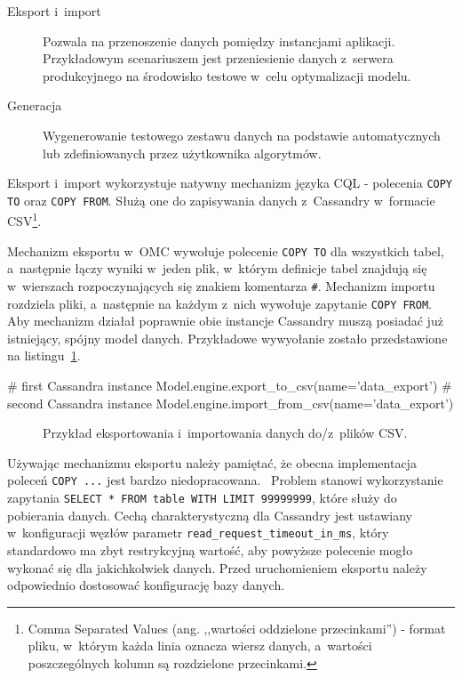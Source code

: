 \begin{description}
	\item[Eksport i~import] Pozwala na przenoszenie danych pomiędzy instancjami aplikacji. Przykładowym scenariuszem jest przeniesienie danych z~serwera produkcyjnego na środowisko testowe w~celu optymalizacji modelu.
	\item[Generacja] Wygenerowanie testowego zestawu danych na podstawie automatycznych lub zdefiniowanych przez użytkownika algorytmów.
\end{description}

Eksport i~import wykorzystuje natywny mechanizm języka CQL - polecenia \verb+COPY TO+ oraz \verb+COPY FROM+. Służą one do zapisywania danych z~Cassandry w~formacie CSV\footnote{Comma Separated Values (ang. ,,wartości oddzielone przecinkami'') - format pliku, w~którym każda linia oznacza wiersz danych, a~wartości poszczególnych kolumn są rozdzielone przecinkami.}. 

Mechanizm eksportu w~OMC wywołuje polecenie \verb+COPY TO+ dla wszystkich tabel, a~następnie łączy wyniki w~jeden plik, w~którym definicje tabel znajdują się w~wierszach rozpoczynających się znakiem komentarza \verb+#+. Mechanizm importu rozdziela pliki, a~następnie na każdym z~nich wywołuje zapytanie \verb+COPY FROM+. Aby mechanizm działał poprawnie obie instancje Cassandry muszą posiadać już istniejący, spójny model danych. Przykładowe wywyołanie zostało przedstawione na listingu~\ref{vrb:export_import_example}.

\begin{verbbox}
	# first Cassandra instance
	Model.engine.export_to_csv(name='data_export')
	# second Cassandra instance
	Model.engine.import_from_csv(name='data_export')
\end{verbbox}

\begin{figure}[ht!]
	\centering
	\theverbbox
	\caption{Przykład eksportowania i~importowania danych do/z~plików CSV.}
	\label{vrb:export_import_example}
\end{figure}

Używając mechanizmu eksportu należy pamiętać, że obecna implementacja poleceń \verb+COPY ...+ jest bardzo niedopracowana.~\cite{simple_data_importing_and_exporting} Problem stanowi wykorzystanie zapytania \verb+SELECT * FROM table WITH LIMIT 99999999+, które służy do pobierania danych. Cechą charakterystyczną dla Cassandry jest ustawiany w~konfiguracji węzłów parametr \verb+read_request_timeout_in_ms+, który standardowo ma zbyt restrykcyjną wartość, aby powyższe polecenie mogło wykonać się dla jakichkolwiek danych. Przed uruchomieniem eksportu należy odpowiednio dostosować konfigurację bazy danych.

